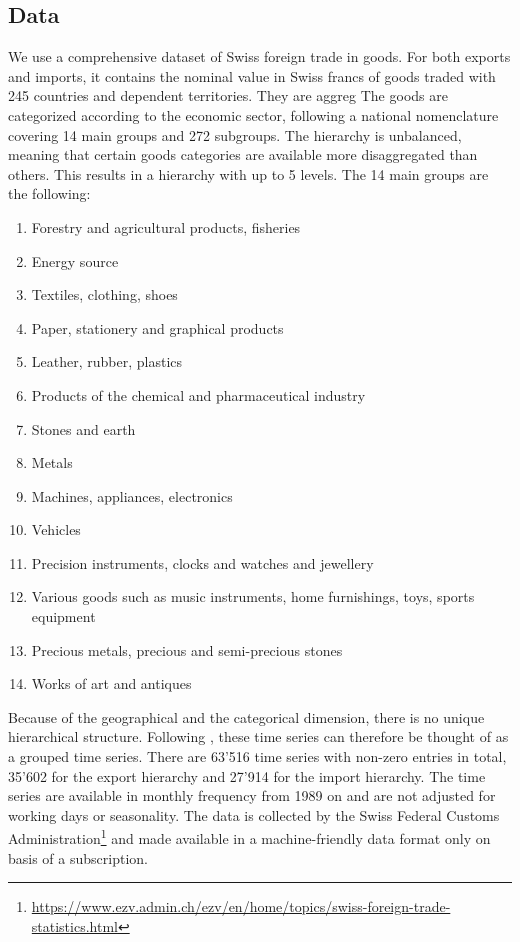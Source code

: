 \documentclass[a4paper,fleqn,11pt]{article}
\begin{document}
\subsection{Data}
We use a comprehensive dataset of Swiss foreign trade in goods. For both exports and imports, it contains the nominal value in Swiss francs of goods traded with 245 countries and dependent territories. They are aggreg The goods are categorized according to the economic sector, following a national nomenclature covering 14 main groups and 272 subgroups. The hierarchy is unbalanced, meaning that certain goods categories are available more disaggregated than others. This results in a hierarchy with up to 5 levels. The 14 main groups are the following:
\begin{enumerate}[itemsep=-1ex,partopsep=1ex,parsep=1ex]
    \item Forestry and agricultural products, fisheries
    \item Energy source
    \item Textiles, clothing, shoes
    \item Paper, stationery and graphical products
    \item Leather, rubber, plastics 
    \item Products of the chemical and pharmaceutical industry
    \item Stones and earth
    \item Metals
    \item Machines, appliances, electronics
    \item Vehicles
    \item Precision instruments, clocks and watches and jewellery  
    \item Various goods such as music instruments, home furnishings, toys, sports equipment
    \item Precious metals, precious and semi-precious stones
    \item Works of art and antiques
\end{enumerate}
Because of the geographical and the categorical dimension, there is no unique hierarchical structure. Following \cite{Hyndman2016}, these time series can therefore be thought of as a grouped time series. There are 63'516 time series with non-zero entries in total, 35'602 for the export hierarchy and 27'914 for the import hierarchy. The time series are available in monthly frequency from 1989 on and are not adjusted for working days or seasonality. The data is collected by the Swiss Federal Customs Administration\footnote{\url{https://www.ezv.admin.ch/ezv/en/home/topics/swiss-foreign-trade-statistics.html}} and made available in a machine-friendly data format only on basis of a subscription.\\
\end{document}
